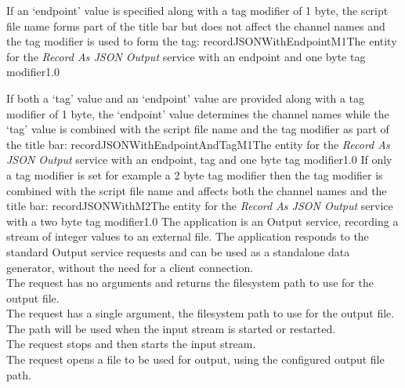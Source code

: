 If an `endpoint' value is specified along with a tag modifier of 1 byte, the script file
name forms part of the title bar but does not affect the channel names and the tag
modifier is used to form the tag:
%
{recordJSONWithEndpointM1}{The \emph{\MMMU} entity for the \emph{Record As JSON Output}
service with an endpoint and one byte tag modifier}{1.0}

If both a `tag' value and an `endpoint' value are provided along with a tag modifier of 1
byte, the `endpoint' value determines the channel names while the `tag' value is combined
with the script file name and the tag modifier as part of the title bar:
%
{recordJSONWithEndpointAndTagM1}{The \emph{\MMMU} entity for the \emph{Record As JSON
Output} service with an endpoint, tag and one byte tag modifier}{1.0}
\condPage{}
If only a tag modifier is set \longDash{} for example a 2 byte tag modifier \longDash{}
then the tag modifier is combined with the script file name and affects both the channel
names and the title bar:
%
{recordJSONWithM2}{The \emph{\MMMU} entity for the \emph{Record As JSON Output} service
with a two byte tag modifier}{1.0}
The  application is an Output
service, recording a stream of integer values to an external file.
The application responds to the standard Output service requests and can be used as a
standalone data generator, without the need for a client connection.\\

The  request has no arguments and
returns the file\longDash{}system path to use for the output file.\\

The  request has a single argument,
the file\longDash{}system path to use for the output file.
The path will be used when the input stream is started or restarted.\\

The  request stops and then
starts the input stream.\\

The  request opens a file to be
used for output, using the configured output file path.\\

